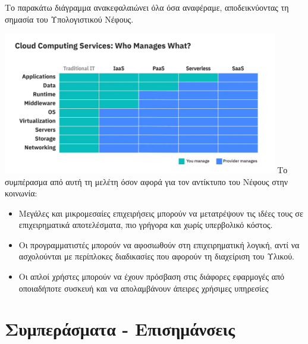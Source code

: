 \documentclass{article}
\begin{document}
Το παρακάτω διάγραμμα ανακεφαλαιώνει όλα όσα αναφέραμε, αποδεικνύοντας τη σημασία του Υπολογιστικού Νέφους. 


\includegraphics[width=120mm]{ibm.jpg}
Το συμπέρασμα από αυτή τη μελέτη όσον αφορά για τον αντίκτυπο του Νέφους στην κοινωνία:
\begin{itemize}
\item Μεγάλες και μικρομεσαίες επιχειρήσεις μπορούν να μετατρέψουν τις ιδέες τους σε επιχειρηματικά αποτελέσματα, πιο γρήγορα και χωρίς υπερβολικό κόστος.
\item Οι προγραμματιστές μπορούν να αφοσιωθούν στη επιχειρηματική λογική, αντί να ασχολούνται με περίπλοκες διαδικασίες που αφορούν τη διαχείριση του Υλικού.
\item	Οι απλοί χρήστες μπορούν να έχουν πρόσβαση στις διάφορες εφαρμογές από οποιαδήποτε συσκευή και να απολαμβάνουν άπειρες χρήσιμες υπηρεσίες
\end{itemize}

\section{Συμπεράσματα - Επισημάνσεις}
\end{document}
